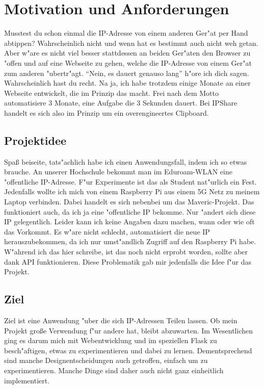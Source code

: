 
\chapter{Motivation und Anforderungen}\label{ch:motivation-und-anforderungen}
Musstest du schon einmal die IP-Adresse von einem anderen Ger{"a}t per Hand abtippen?
Wahrscheinlich nicht und wenn hat es bestimmt auch nicht weh getan.
Aber w{"a}re es nicht viel besser stattdessen an beiden Ger{"a}ten den Browser zu {"o}ffen und auf eine Webseite zu gehen,
welche die IP-Adresse von einem Ger{"a}t zum anderen {"u}bertr{"a}gt.
``Nein, es dauert genauso lang'' h{"o}re ich dich sagen.
Wahrscheinlich hast du recht.
Na ja, ich habe trotzdem einige Monate an einer Webseite entwickelt, die im Prinzip das macht.
Frei nach dem Motto automatisiere 3 Monate, eine Aufgabe die 3 Sekunden dauert.
Bei IPShare handelt es sich also im Prinzip um ein overengineertes Clipboard.


\section{Projektidee}\label{sec:projektidee}
Spa{\ss} beiseite, tats{"a}chlich habe ich einen Anwendungsfall, indem ich so etwas brauche.
An unserer Hochschule bekommt man im Eduroam-WLAN eine {"o}ffentliche IP-Adresse.
F{"u}r Experimente ist das als Student nat{"u}rlich ein Fest.
Jedenfalls wollte ich mich von einem Raspberry Pi aus einem 5G Netz zu meinem Laptop verbinden.
Dabei handelt es sich nebenbei um das Maveric-Projekt.
Das funktioniert auch, da ich ja eine {"o}ffentliche IP bekomme.
Nur {"a}ndert sich diese IP gelegentlich.
Leider kann ich keine Angaben dazu machen, wann oder wie oft das Vorkommt.
Es w{"a}re nicht schlecht, automatisiert die neue IP herauszubekommen, da ich nur umst{"a}ndlich Zugriff auf den Raspberry Pi habe.
W{"a}hrend ich das hier schreibe, ist das noch nicht erprobt worden, sollte aber dank API funktionieren.
Diese Problematik gab mir jedenfalls die Idee f{"u}r das Projekt.

\section{Ziel}\label{sec:ziel}
Ziel ist eine Anwendung {"u}ber die sich IP-Adressen Teilen lassen.
Ob mein Projekt gro{\ss}e Verwendung f{"u}r andere hat, bleibt abzuwarten.
Im Wesentlichen ging es darum mich mit Webentwicklung und im speziellen Flask zu besch{"a}ftigen, etwas zu experimentieren und dabei zu lernen.
Dementsprechend sind manche Designentscheidungen auch getroffen, einfach um zu experimentieren.
Manche Dinge sind daher auch nicht ganz einheitlich implementiert.

